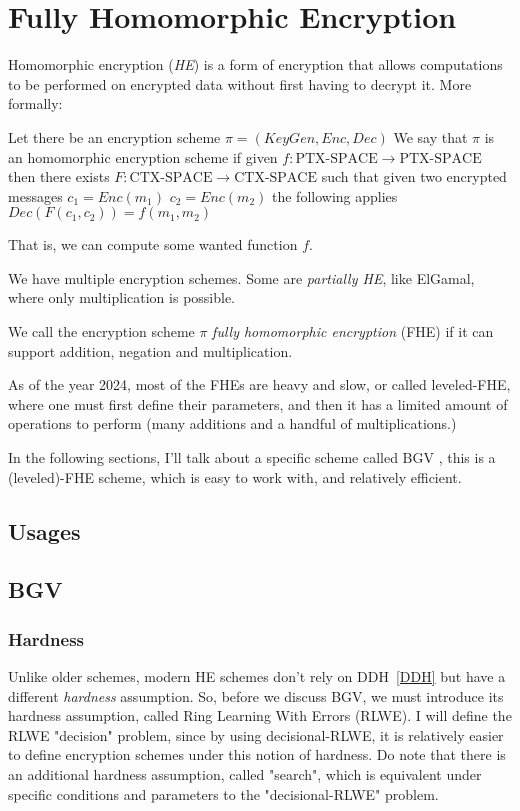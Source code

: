 
\chapter{Fully Homomorphic Encryption}
Homomorphic encryption (\emph{HE}) is a form of encryption that allows 
computations to be performed on encrypted data without first having to decrypt it.
More formally:
\begin{defn}[HE]
 Let there be an encryption scheme $\pi = (KeyGen,Enc, Dec)$
 We say that $\pi$ is an homomorphic encryption scheme if
 given $f:\text{PTX-SPACE}\to \text{PTX-SPACE}$ then there
 exists $F:\text{CTX-SPACE} \to \text{CTX-SPACE}$ such that
 given two encrypted messages $c_1=Enc(m_1)$ $c_2=Enc(m_2)$ the following
 applies
   $Dec(F(c_1,c_2))=f(m_1,m_2)$
\end{defn}

That is, we can compute some wanted function $f$.

We have multiple encryption schemes. Some are \emph{partially HE},
like ElGamal, where only multiplication is possible.
\begin{thm}
 We call the encryption scheme $\pi$ \emph{fully homomorphic encryption} (FHE) if it 
 can support addition, negation and multiplication.
\end{thm}

As of the year 2024, most of the FHEs are heavy and slow,
or called leveled-FHE, where one must first define their parameters, 
and then it has a limited amount of operations to perform (many additions and a 
handful of multiplications.)

In the following sections, I'll talk about a specific scheme called BGV \cite{BGV},
this is a (leveled)-FHE scheme, which is easy to work with, and relatively efficient.

\section{Usages}

\section{BGV}
\subsection{Hardness}
Unlike older schemes, modern HE schemes don't rely on DDH~\ref{DDH} 
but have a different \emph{hardness} assumption.
So, before we discuss BGV, we must introduce its hardness assumption,
called Ring Learning With Errors (RLWE). 
I will define the RLWE "decision" problem, since by using decisional-RLWE,
it is relatively easier to define encryption schemes under this notion of hardness.
Do note that there is an additional hardness assumption, called "search", 
which is equivalent under specific conditions and parameters to 
the "decisional-RLWE" problem.

